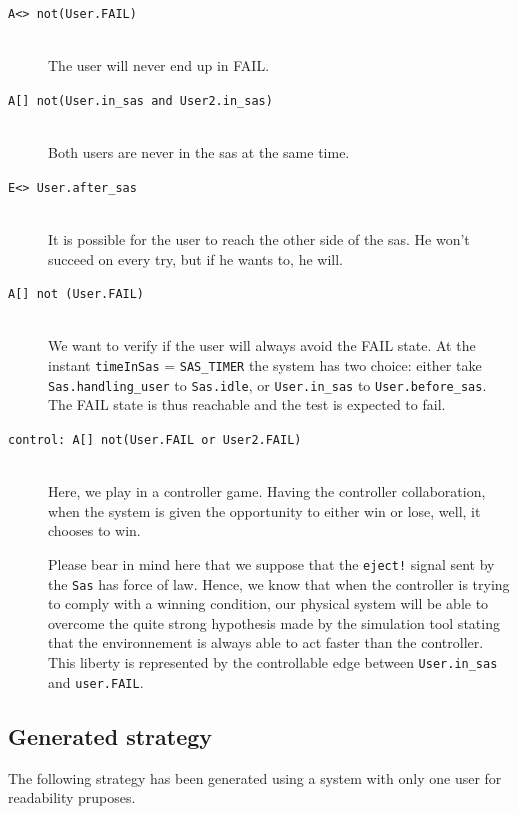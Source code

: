 \begin{description}
	\item[\texttt{A<> not(User.FAIL)}] ~\\
    	The user will never end up in FAIL.
        
    \item[\texttt{A[] not(User.in\_sas and User2.in\_sas)}] ~\\     
    Both users are never in the sas at the same time.
    
    
    \item[\texttt{E<> User.after\_sas}] ~\\
    	It is possible for the user to reach the other side of the sas. He won't succeed on every try, but if he wants to, he will.

    \item[\texttt{A[] not (User.FAIL)}] ~\\
    	We want to verify if the user will always avoid the FAIL state.
        At the instant \texttt{timeInSas} = \texttt{SAS\_TIMER} the system has two choice: either take \texttt{Sas.handling\_user} to \texttt{Sas.idle}, or \texttt{User.in\_sas} to \texttt{User.before\_sas}.
        The FAIL state is thus reachable and the test is expected to fail.
    
    \item[\texttt{control: A[] not(User.FAIL or User2.FAIL)}] ~\\
    Here, we play in a controller game.
    Having the controller collaboration, when the system is given the opportunity to either win or lose, well, it chooses to win.
    
    Please bear in mind here that we suppose that the \texttt{eject!} signal sent by the \texttt{Sas} has force of law.
    Hence, we know that when the controller is trying to comply with a winning condition, our physical system will be able to overcome the quite strong hypothesis made by the simulation tool stating that the environnement is always able to act faster than the controller.
    This liberty is represented by the controllable edge between \texttt{User.in\_sas} and \texttt{user.FAIL}.
\end{description}

\subsection{Generated strategy}
The following strategy has been generated using a system with only one user for readability pruposes.

